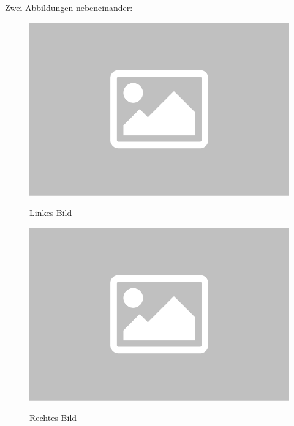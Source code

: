 	\newpage 
	
	Zwei Abbildungen nebeneinander:
	
	\begin{figure}[H]
		\centering
		\begin{minipage}{0.45\linewidth}
			\includegraphics[width=1.0\linewidth]{pictures/platzhalter_bild.png}
			\caption{Linkes Bild}
			\centering
			\label{fig:platzhalter_bild2}
		\end{minipage}\hspace{2em}%
		\begin{minipage}{0.45\linewidth}
			\includegraphics[width=1.0\linewidth]{pictures/platzhalter_bild.png}
			\caption{Rechtes Bild}
			\centering
			\label{fig:platzhalter_bild3}
		\end{minipage}
	\end{figure}
	

